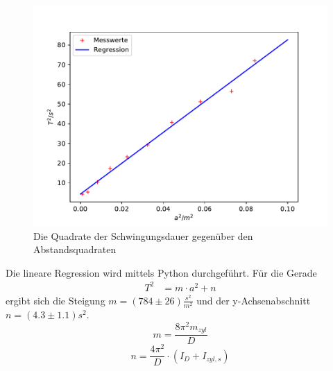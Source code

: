 \begin{figure}[H]
 \centering
 \includegraphics[width=\textwidth]{plot1.pdf}
 \caption{Die Quadrate der Schwingungsdauer gegenüber den Abstandsquadraten}
 \label{fig:2}
\end{figure}

Die lineare Regression wird mittels Python durchgeführt. Für die Gerade
\begin{align}
 T^2 &= m \cdot a^2 + n
\end{align}
ergibt sich die Steigung $m = (784 \pm 26) \frac{s^2}{m^2}$
und der y-Achsenabschnitt $n = (4.3 \pm 1.1) s^2$.
\begin{equation*}
  m= \frac{8\pi^2m_{zyl}}{D}
\end{equation*}
\begin{equation}
  n= \frac{4\pi^2}{D}\cdot (I_D + I_{zyl,s})
  \label{eqn:eig}
\end{equation}

